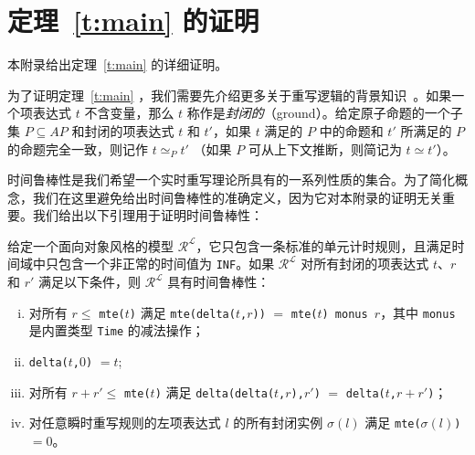 \chapter{定理~\ref{t:main} 的证明}
\label{app:proof}


本附录给出定理~\ref{t:main} 的详细证明。

为了证明定理~\ref{t:main} ，我们需要先介绍更多关于重写逻辑的背景知识~\cite{DBLP:journals/entcs/OlveczkyM07a}。如果一个项表达式 $t$ 不含变量，那么 $t$ 称作是\emph{封闭的}（ground）。给定原子命题的一个子集 $P\subseteq AP$ 和封闭的项表达式 $t$ 和 $t'$，如果 $t$ 满足的 $P$ 中的命题和 $t'$ 所满足的 $P$ 的命题完全一致，则记作 $t\simeq_P t'$ （如果 $P$ 可从上下文推断，则简记为 $t\simeq t'$）。

时间鲁棒性是我们希望一个实时重写理论所具有的一系列性质的集合。为了简化概念，我们在这里避免给出时间鲁棒性的准确定义，因为它对本附录的证明无关重要。我们给出以下引理用于证明时间鲁棒性：
\begin{lemma}
\label{l:timerobustness}
给定一个面向对象风格的模型 $\mathcal{R^L}$，它只包含一条标准的单元计时规则，且满足时间域中只包含一个非正常的时间值为 \verb|INF|。如果 $\mathcal{R^L}$ 对所有封闭的项表达式 $t$、$r$ 和 $r'$ 满足以下条件，则 $\mathcal{R^L}$ 具有时间鲁棒性：
\begin{enumerate}[(i)]
\item 
对所有 $r\le$ \verb|mte(|$t$\verb|)| 满足
\verb|mte(delta(|$t$\verb|,|$r$\verb|))| $=$
\verb|mte(|$t$\verb|) monus |$r$，其中 \verb|monus| 是内置类型 \verb|Time| 的减法操作；

\item
\verb|delta(|$t$\verb|,|$0$\verb|)| $= t$;

\item
对所有 $r+r'\le$ \verb|mte(|$t$\verb|)| 满足
\verb|delta(delta(|$t$\verb|,|$r$\verb|),|$r'$\verb|)| $=$
\verb|delta(|$t$\verb|,|$r+r'$\verb|)|；

\item
对任意瞬时重写规则的左项表达式 $l$ 的所有封闭实例 $\sigma(l)$ 满足
\verb|mte(|$\sigma(l)$\verb|)|$= 0$。
\end{enumerate}
\end{lemma}

